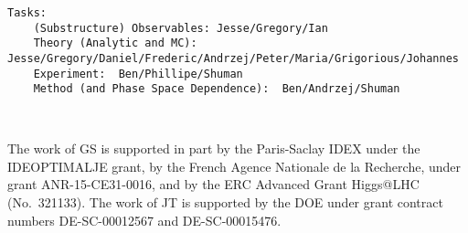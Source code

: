 \documentclass[11pt,letterpaper]{article}
\begin{document}
\begin{verbatim}
Tasks:
	(Substructure) Observables: Jesse/Gregory/Ian
	Theory (Analytic and MC): Jesse/Gregory/Daniel/Frederic/Andrzej/Peter/Maria/Grigorious/Johannes
	Experiment:  Ben/Phillipe/Shuman
	Method (and Phase Space Dependence):  Ben/Andrzej/Shuman
	


\end{verbatim}

\begin{acknowledgments}

The work of GS is supported in part by the Paris-Saclay IDEX under the
IDEOPTIMALJE grant, by the French Agence Nationale de la Recherche,
under grant ANR-15-CE31-0016, and by the ERC Advanced Grant Higgs@LHC
(No.\ 321133).
%
The work of JT is supported by the DOE under grant contract numbers DE-SC-00012567 and DE-SC-00015476.

\end{acknowledgments}



\end{document}
